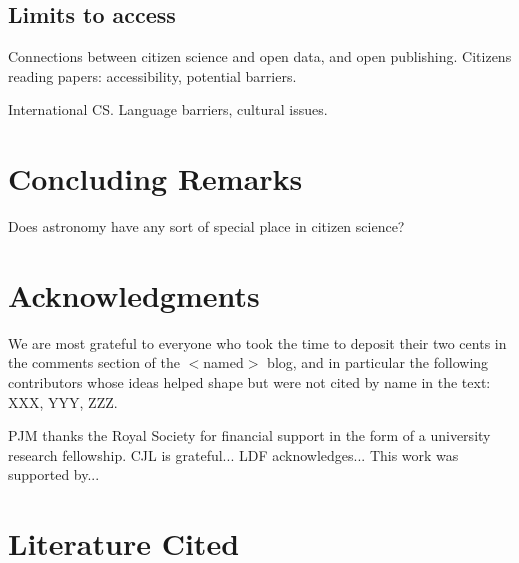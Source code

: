 \documentclass{ar2e}
\begin{document}

\subsection{Limits to access}
\label{sec:limits:access}

Connections between citizen science and open data, and open publishing. 
Citizens reading papers: accessibility, potential barriers. 

International CS. Language barriers, cultural issues. 



\section{Concluding Remarks}
\label{sec:conclusions}

Does astronomy have any sort of special place in citizen science?



\section*{Acknowledgments}

We are most grateful to everyone who took the time to deposit their two cents in
the comments section of the $<$named$>$ blog, and in particular the following
contributors whose ideas helped shape  but were not cited by
name in the text: XXX, YYY, ZZZ. 

PJM thanks the Royal Society for financial support in the form of a university
research fellowship.
%
CJL is grateful...
%
LDF acknowledges...
% 
This work was supported by...


\section{Literature Cited}





\end{document}
